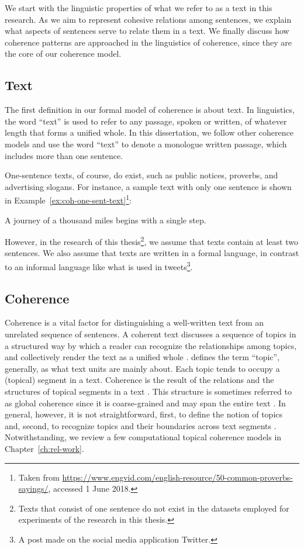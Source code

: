 We start with the linguistic properties of what we refer to as a text in this research. 
As we aim to represent cohesive relations among sentences, we explain what aspects of sentences serve to relate them in a text. 
We finally discuss how coherence patterns are approached in the linguistics of coherence, since they are the core of our coherence model.  

\subsection{Text}

The first definition in our formal model of coherence is about text. 
In linguistics, the word ``text'' is used to refer to any passage, spoken or written, of whatever length that forms a unified whole.  
In this dissertation, we follow other coherence models \cite{barzilay08,guinaudeau13} and use the word ``text'' to denote a  monologue written passage, which includes more than one sentence.

One-sentence texts, of course, do exist, such as public notices, proverbs, and advertising slogans.  
For instance, a sample text with only one sentence is shown in Example~\ref{ex:coh-one-sent-text}\footnote{Taken from \url{https://www.engvid.com/english-resource/50-common-proverbs-sayings/}, accessed 1 June 2018.}: 

\begin{examples}
    \label{ex:coh-one-sent-text}
    A journey of a thousand miles begins with a single step.
\end{examples}

However, in the research of this thesis\footnote{Texts that consist of one sentence do not exist in the datasets employed for experiments of the research in this thesis.}, we assume that texts contain at least two sentences. 
We also assume that texts are written in a formal language, in contrast to an informal language like what is used in tweets\footnote{A post made on the social media application Twitter.}. 

\subsection{Coherence}

Coherence is a vital factor for distinguishing a well-written text from an unrelated sequence of sentences. 
A coherent text discusses a sequence of topics in a structured way by which a reader can recognize the relationships among topics, and collectively render the text as a unified whole \cite{stede12}. 
 defines the term ``topic'',  generally, as what text units are mainly about.   
Each topic tends to occupy a (topical) segment in a text. 
Coherence is the result of the relations and the structures of topical segments in a text \cite{hearst97}. 
This structure is sometimes referred to as global coherence since it is coarse-grained and may span the entire text \cite{elsner07}. 
In general, however, it is not straightforward, first, to define the notion of topics and, second, to recognize topics and their boundaries across text segments \cite{stede12}. 
Notwithstanding, we review a few computational topical coherence models in Chapter~\ref{ch:rel-work}. 

